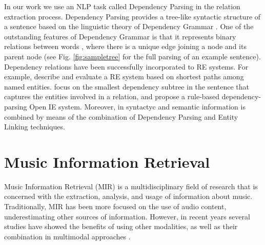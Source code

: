 

In our work we use an NLP task called Dependency Parsing in the relation extraction process. Dependency Parsing provides a tree-like syntactic structure of a sentence based on the linguistic theory of Dependency Grammar \citep{Tesniere1959}. One of the outstanding features of Dependency Grammar is that it represents binary relations between words \citep{BallesterosNivre2013}, where there is a unique edge joining a node and its parent node (see Fig. \ref{fig:sampletree} for the full parsing of an example sentence).
Dependency relations have been successfully incorporated to RE systems. For example, \citep{BunescuandMooney2005} describe and evaluate a RE system based on shortest paths among named entities. \citep{CulottaSorensen2004} focus on the smallest dependency subtree in the sentence that captures the entities involved in a relation, and \citep{Gamallo2012} propose a rule-based dependency-parsing Open IE system. Moreover, in \citep{Nakasholeetal2012,MoroandNavigli2012,DelliBovietal2015b} syntactyc and semantic information is combined by means of the combination of Dependency Parsing and Entity Linking techniques.


\section{Music Information Retrieval}
\label{sec:SOA:mir}

Music Information Retrieval (MIR) is a multidisciplinary field of research that is concerned with the extraction, analysis, and usage of information about music. Traditionally, MIR has been more focused on the use of audio content, underestimating other sources of information. However, in recent years several studies have showed the benefits of using other modalities, as well as their combination in multimodal approaches \cite{Schedl2014}. 


